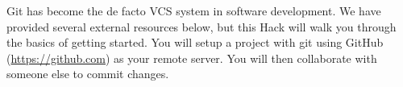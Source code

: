 \documentclass[12pt]{scrartcl}
\begin{document}
Git has become the de facto VCS system in software development.  We have
provided several external resources below, but this Hack will walk you
through the basics of getting started.  You will setup a project with 
git using GitHub (\url{https://github.com}) as your remote server.  You
will then collaborate with someone else to commit changes.

%
%
%
%
%
%
%  
%  
\end{document}
